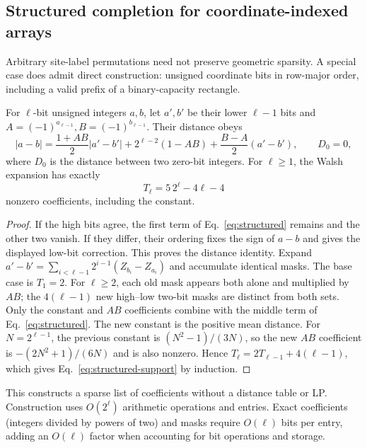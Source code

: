 \subsection{Structured completion for coordinate-indexed arrays}
\label{sec:structured}
Arbitrary site-label permutations need not preserve geometric sparsity. A
special case does admit direct construction: unsigned coordinate bits in
row-major order, including a valid prefix of a binary-capacity rectangle.
\begin{lemma}
\label{lem:structured}
For $\ell$-bit unsigned integers $a,b$, let $a',b'$ be their lower $\ell-1$
bits and $A=(-1)^{a_{\ell-1}}, B=(-1)^{b_{\ell-1}}$. Their distance obeys
\begin{equation}
 |a-b|=\frac{1+AB}{2}|a'-b'|
 +2^{\ell-2}(1-AB)+\frac{B-A}{2}(a'-b'),
 \qquad D_0=0,
 \label{eq:structured}
\end{equation}
where $D_0$ is the distance between two zero-bit integers. For $\ell\ge1$,
the Walsh expansion has exactly
\begin{equation}
 T_\ell=5\,2^\ell-4\ell-4
 \label{eq:structured-support}
\end{equation}
nonzero coefficients, including the constant.
\end{lemma}
\begin{proof}
If the high bits agree, the first term of Eq.~\eqref{eq:structured} remains
and the other two vanish. If they differ, their ordering fixes the sign of
$a-b$ and gives the displayed low-bit correction. This proves the distance
identity. Expand
$a'-b'=\sum_{i<\ell-1}2^{i-1}(Z_{b_i}-Z_{a_i})$ and accumulate identical
masks. The base case is $T_1=2$. For $\ell\ge2$, each old mask appears both
alone and multiplied by $AB$; the $4(\ell-1)$ new high--low two-bit masks
are distinct from both sets. Only the constant and $AB$ coefficients combine
with the middle term of Eq.~\eqref{eq:structured}. The new constant is the
positive mean distance. For $N=2^{\ell-1}$, the previous constant is
$(N^2-1)/(3N)$, so the new $AB$ coefficient is $-(2N^2+1)/(6N)$ and is also
nonzero. Hence $T_\ell=2T_{\ell-1}+4(\ell-1)$, which gives
Eq.~\eqref{eq:structured-support} by induction.
\end{proof}
This constructs a sparse list of coefficients without a distance table or LP.
Construction uses $O(2^\ell)$ arithmetic operations and entries.
Exact coefficients (integers divided by powers of two) and masks require $O(\ell)$ bits per entry, adding
an $O(\ell)$ factor when accounting for bit operations and storage.

